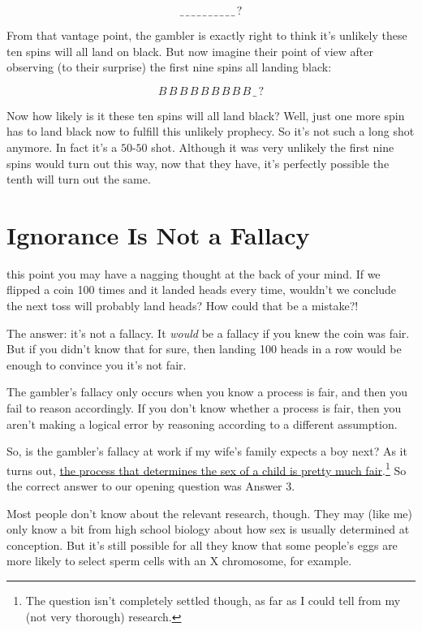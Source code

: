 \documentclass[justified]{tufte-book}
\theoremstyle{definition}
\theoremstyle{definition}
\theoremstyle{definition}
\theoremstyle{remark}
\begin{document}
\[  \_ \, \_ \,\_ \,\_ \,\_ \,\_ \,\_ \,\_ \,\_ \,\_ \, ? \]

From that vantage point, the gambler is exactly right to think it's
unlikely these ten spins will all land on black. But now imagine their
point of view after observing (to their surprise) the first nine spins
all landing black:

\[ B \, B \, B \, B \, B \, B \, B \, B \, B  \, \_ \,? \]

Now how likely is it these ten spins will all land black? Well, just one
more spin has to land black now to fulfill this unlikely prophecy. So
it's not such a long shot anymore. In fact it's a \(50\)-\(50\) shot.
Although it was very unlikely the first nine spins would turn out this
way, now that they have, it's perfectly possible the tenth will turn out
the same.

\hypertarget{ignorance-is-not-a-fallacy}{%
\section{Ignorance Is Not a Fallacy}\label{ignorance-is-not-a-fallacy}}

 this point you may have a nagging thought at the back of
your mind. If we flipped a coin 100 times and it landed heads every
time, wouldn't we conclude the next toss will probably land heads? How
could that be a mistake?!

The answer: it's not a fallacy. It \emph{would} be a fallacy if you knew
the coin was fair. But if you didn't know that for sure, then landing
100 heads in a row would be enough to convince you it's not fair.

The gambler's fallacy only occurs when you know a process is fair, and
then you fail to reason accordingly. If you don't know whether a process
is fair, then you aren't making a logical error by reasoning according
to a different assumption.

So, is the gambler's fallacy at work if my wife's family expects a boy
next? As it turns out,
\href{https://stat.duke.edu/~dalene/chance/chanceweb/144.rodgers.pdf}{the
process that determines the sex of a child is pretty much
fair}.\footnote{The question isn't completely settled though, as far as
  I could tell from my (not very thorough) research.} So the correct
answer to our opening question was Answer 3.

Most people don't know about the relevant research, though. They may
(like me) only know a bit from high school biology about how sex is
usually determined at conception. But it's still possible for all they
know that some people's eggs are more likely to select sperm cells with
an X chromosome, for example.
\end{document}

